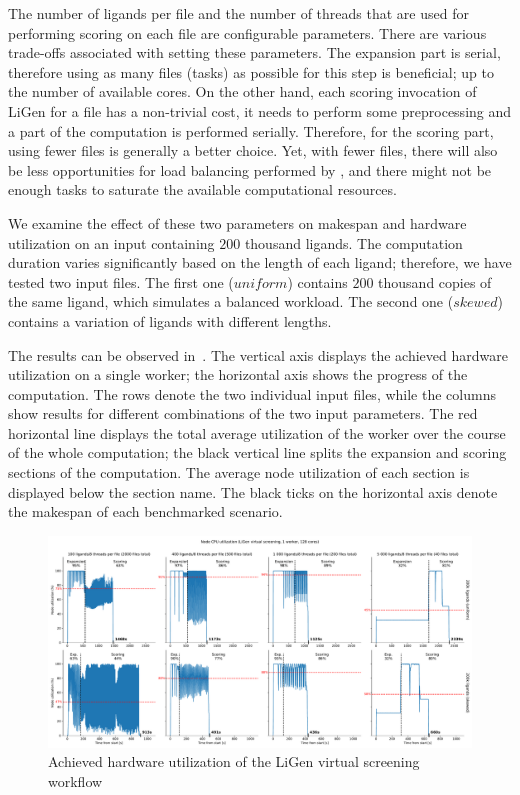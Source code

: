 The number of ligands per file and the number of threads that are used for performing scoring on
each file are configurable parameters. There are various trade-offs associated with setting these
parameters. The expansion part is serial, therefore using as many files (tasks) as possible for
this step is beneficial; up to the number of available cores. On the other hand, each scoring
invocation of LiGen for a file has a non-trivial cost, it needs to perform some preprocessing and a
part of the computation is performed serially. Therefore, for the scoring part, using fewer files
is generally a better choice. Yet, with fewer files, there will also be less opportunities for load
balancing performed by \hq{}, and there might not be enough tasks to saturate the
available computational resources.

We examine the effect of these two parameters on makespan and hardware utilization on an input
containing $200$ thousand ligands. The computation duration varies significantly
based on the length of each ligand; therefore, we have tested two input files. The first one
($uniform$) contains $200$ thousand copies of the same ligand,
which simulates a balanced workload. The second one ($skewed$) contains a variation
of ligands with different lengths.

The results can be observed in~. The vertical axis displays the achieved
hardware utilization on a single worker; the horizontal axis shows the progress of the computation.
The rows denote the two individual input files, while the columns show results for different
combinations of the two input parameters. The red horizontal line displays the total average
utilization of the worker over the course of the whole computation; the black vertical line splits
the expansion and scoring sections of the computation. The average node utilization of each section
is displayed below the section name. The black ticks on the horizontal axis denote the makespan of
each benchmarked scenario.

\begin{figure}[h]
	\centering
	\includegraphics[width=\textwidth]{imgs/hq/charts/ligen-aggregation-utilization}
	\caption{Achieved hardware utilization of the LiGen virtual screening workflow}
	\label{fig:hq-ligen-utilization}
\end{figure}

